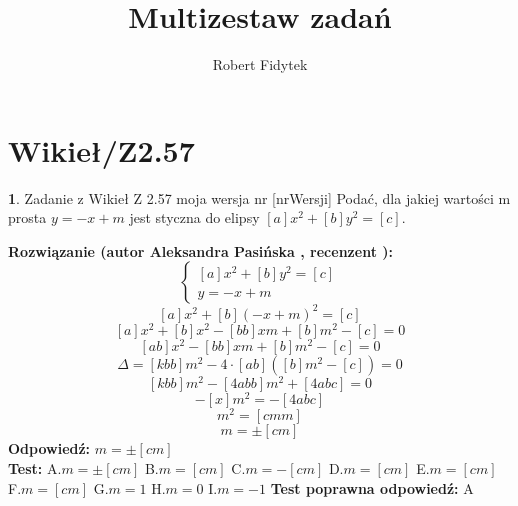 \documentclass[12pt, a4paper]{article}
\title{Multizestaw zadań}
\author{Robert Fidytek}
\date{}
\theoremstyle{definition} %
\newtheorem{zad}{}
\newcommand{\kategoria}[1]{\section{#1}} %
\newcommand{\zadStart}[1]{\begin{zad}#1\newline} %
\newcommand{\zadStop}{\end{zad}}   %
\newcommand{\rozwStart}[2]{\noindent \textbf{Rozwiązanie (autor #1 , recenzent #2): }\newline} %
\newcommand{\rozwStop}{\newline}                                            %
\newcommand{\odpStart}{\noindent \textbf{Odpowiedź:}\newline}    %
\newcommand{\odpStop}{\newline}                                             %
\newcommand{\testStart}{\noindent \textbf{Test:}\newline} %
\newcommand{\testStop}{\newline} %
\newcommand{\kluczStart}{\noindent \textbf{Test poprawna odpowiedź:}\newline} %
\newcommand{\kluczStop}{\newline} %
\begin{document}
\maketitle


\kategoria{Wikieł/Z2.57}
\zadStart{Zadanie z Wikieł Z 2.57 moja wersja nr [nrWersji]}
Podać, dla jakiej wartości m prosta $y=-x+m$ jest styczna do elipsy $[a]x^2+[b]y^2=[c]$.
\zadStop
\rozwStart{Aleksandra Pasińska}{}
$$\left\{ \begin{array}{ll}
[a]x^2+[b]y^2=[c]\\ 
y=-x+m
\end{array} \right.$$
$$[a]x^2+[b](-x+m)^2=[c]$$
$$[a]x^2+[b]x^2-[bb]xm+[b]m^2-[c]=0$$
$$[ab]x^2-[bb]xm+[b]m^2-[c]=0$$
$$\Delta=[kbb]m^2-4\cdot [ab]([b]m^2-[c])=0$$
$$[kbb]m^2-[4abb]m^2+[4abc]=0$$
$$-[x]m^2=-[4abc]$$
$$m^2=[cmm]$$
$$m=\pm [cm]$$
\rozwStop
\odpStart
$m=\pm [cm]$\\
\odpStop
\testStart
A.$m=\pm [cm]$
B.$m=[cm]$
C.$m=-[cm]$
D.$m=[cm]$
E.$m=[cm]$
F.$m=[cm]$
G.$m=1$
H.$ m=0$
I.$m=-1$
\testStop
\kluczStart
A
\kluczStop
\end{document}
